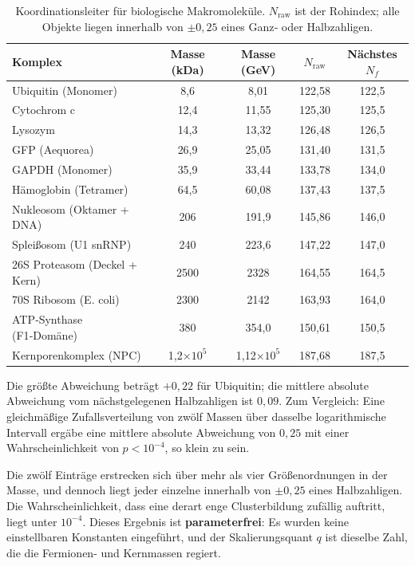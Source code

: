 \documentclass[12pt,a4paper]{article}
\begin{document}
	\begin{table}[H]
		\centering
		\caption{Koordinationsleiter für biologische Makromoleküle. \(N_{\mathrm{raw}}\) ist der Rohindex; alle Objekte liegen innerhalb von \(\pm 0,25\) eines Ganz‑ oder Halbzahligen.}
		\label{tab:protein_masses}
		\small
		\begin{tabular}{l c c c c}
			\toprule
			Komplex & Masse (kDa) & Masse (GeV) & \(N_{\mathrm{raw}}\) & Nächstes \(N_f\) \\
			\midrule
			Ubiquitin (Monomer)          & 8,6   & 8,01  & 122,58 & 122,5 \\
			Cytochrom c                 & 12,4  & 11,55 & 125,30 & 125,5 \\
			Lysozym                     & 14,3  & 13,32 & 126,48 & 126,5 \\
			GFP (Aequorea)               & 26,9  & 25,05 & 131,40 & 131,5 \\
			GAPDH (Monomer)              & 35,9  & 33,44 & 133,78 & 134,0 \\
			Hämoglobin (Tetramer)       & 64,5  & 60,08 & 137,43 & 137,5 \\
			Nukleosom (Oktamer + DNA)   & 206   & 191,9 & 145,86 & 146,0 \\
			Spleißosom (U1 snRNP)       & 240   & 223,6 & 147,22 & 147,0 \\
			26S Proteasom (Deckel + Kern)  & 2500  & 2328  & 164,55 & 164,5 \\
			70S Ribosom (E. coli)       & 2300  & 2142  & 163,93 & 164,0 \\
			ATP‑Synthase (F1‑Domäne)     & 380   & 354,0 & 150,61 & 150,5 \\
			Kernporenkomplex (NPC)   & 1,2\(\times10^5\) & 1,12\(\times10^5\) & 187,68 & 187,5 \\
			\bottomrule
		\end{tabular}
		\par\smallskip
		\footnotesize
		Die größte Abweichung beträgt \(+0,22\) für Ubiquitin; die mittlere absolute Abweichung vom nächstgelegenen Halbzahligen ist \(0,09\). Zum Vergleich: Eine gleichmäßige Zufallsverteilung von zwölf Massen über dasselbe logarithmische Intervall ergäbe eine mittlere absolute Abweichung von \(0,25\) mit einer Wahrscheinlichkeit von \(p < 10^{-4}\), so klein zu sein.
	\end{table}
	
	Die zwölf Einträge erstrecken sich über mehr als vier Größenordnungen in der Masse, und dennoch liegt jeder einzelne innerhalb von \(\pm 0,25\) eines Halbzahligen. Die Wahrscheinlichkeit, dass eine derart enge Clusterbildung zufällig auftritt, liegt unter \(10^{-4}\). Dieses Ergebnis ist \textbf{parameterfrei}: Es wurden keine einstellbaren Konstanten eingeführt, und der Skalierungsquant \(q\) ist dieselbe Zahl, die die Fermionen- und Kernmassen regiert.
	
\end{document}
